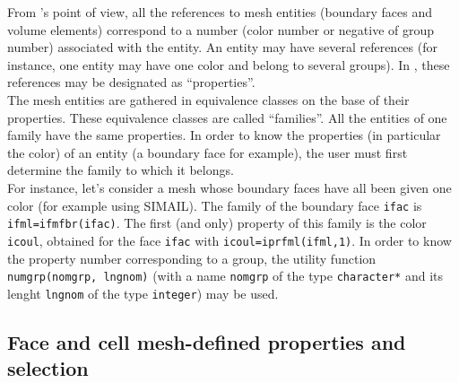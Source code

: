 {{{From \CS 's point of view, all the references to mesh entities (boundary faces
and volume elements) correspond to a number (color number or negative
of group number) associated with the entity. An entity may have several
references (for instance, one entity may have one color and belong to
several groups). In \CS, these references may be designated as
``properties''. \\
The mesh entities are gathered in equivalence classes on the base of
their properties. These equivalence classes are called ``families''. All
the entities of one family have the same properties. In order to know
the properties (in particular the color) of an entity (a boundary face
for example), the user must first determine the family to which it
belongs. \\
For instance, let's consider a mesh whose boundary faces have all been
given one color (for example using SIMAIL). The family of the boundary
face \texttt{ifac} is \texttt{ifml=ifmfbr(ifac)}. The first (and only)
property of this family is the color \texttt{icoul}, obtained for the face
\texttt{ifac} with \texttt{icoul=iprfml(ifml,1)}. In order to know the
property number corresponding to a group, the utility function
\texttt{numgrp(nomgrp, lngnom)} (with a name
\texttt{nomgrp} of the type \texttt{character*} and its lenght
\texttt{lngnom} of the type \texttt{integer}) may be used.

\subsection{Face and cell mesh-defined properties and selection}
\label{selection_criteria}

}}}
